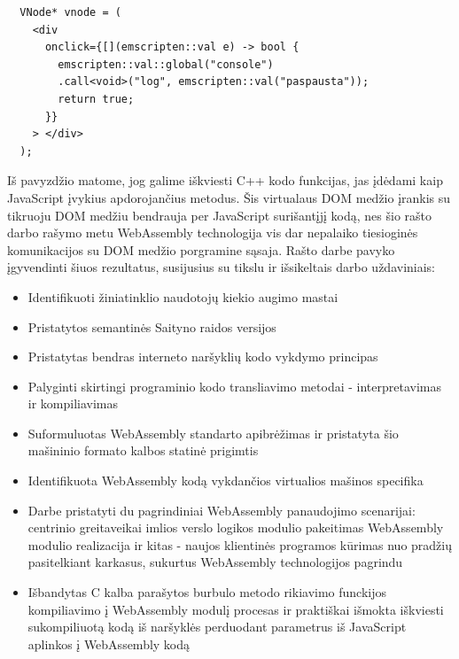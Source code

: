 \documentclass{VUMIFPSkursinis}
\begin{document}
\begin{center}
\begin{small}
\begin{verbatim}
  VNode* vnode = (
    <div
      onclick={[](emscripten::val e) -> bool {
        emscripten::val::global("console")
        .call<void>("log", emscripten::val("paspausta"));
        return true;
      }}
    > </div>
  );
\end{verbatim}
\end{small}
\end{center}
Iš pavyzdžio matome, jog galime iškviesti C++ kodo funkcijas, jas įdėdami kaip JavaScript įvykius apdorojančius metodus. Šis virtualaus DOM medžio įrankis su tikruoju DOM medžiu bendrauja per JavaScript surišantįjį kodą, nes šio rašto darbo rašymo metu WebAssembly technologija vis dar nepalaiko tiesioginės komunikacijos su DOM medžio porgramine sąsaja.
Rašto darbe pavyko įgyvendinti šiuos rezultatus, susijusius su tikslu ir išsikeltais darbo uždaviniais:
\begin{itemize}
  \item Identifikuoti žiniatinklio naudotojų kiekio augimo mastai
  \item Pristatytos semantinės Saityno raidos versijos
  \item Pristatytas bendras interneto naršyklių kodo vykdymo principas
  \item Palyginti skirtingi programinio kodo transliavimo metodai - interpretavimas ir kompiliavimas
\item Suformuluotas WebAssembly standarto apibrėžimas ir pristatyta šio mašininio formato kalbos statinė prigimtis
  \item Identifikuota WebAssembly kodą vykdančios virtualios mašinos specifika
  \item Darbe pristatyti du pagrindiniai WebAssembly panaudojimo scenarijai: centrinio greitaveikai imlios verslo logikos modulio pakeitimas WebAssembly modulio realizacija ir kitas - naujos klientinės programos kūrimas nuo pradžių pasitelkiant karkasus, sukurtus WebAssembly technologijos pagrindu
  \item  Išbandytas C kalba parašytos burbulo metodo rikiavimo funckijos kompiliavimo į WebAssembly modulį procesas ir praktiškai išmokta iškviesti sukompiliuotą kodą iš naršyklės perduodant parametrus iš JavaScript aplinkos  į WebAssembly kodą
\end{itemize}
\end{document}
